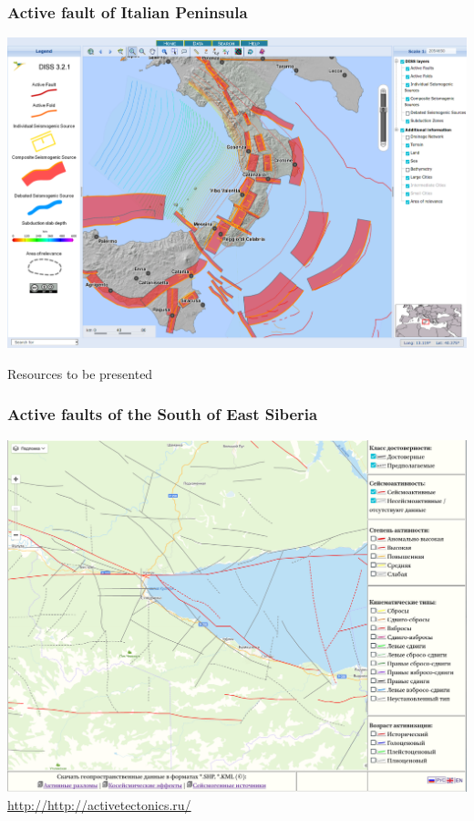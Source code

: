 \documentclass[10pt]{beamer}
\begin{document}
\begin{frame}
  \frametitle{Active fault of Italian Peninsula}
  \centering
  \includegraphics[width=\linewidth]{italy-2.png}
\end{frame}

\begin{frame}\centering
  \Large Resources to be presented
\end{frame}

\begin{frame}
  \frametitle{Active faults of the South of East Siberia}
  \centering
  \includegraphics[width=0.9\linewidth]{activetectonics.png}
  \url{http://http://activetectonics.ru/}
\end{frame}
\end{document}
